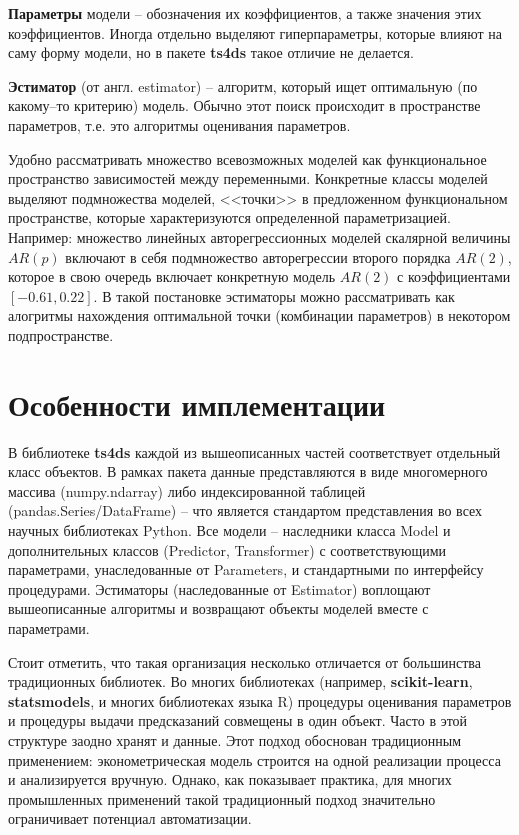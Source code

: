 \documentclass[a4paper,14pt]{extreport}
\begin{document}
	\textbf{Параметры} модели -- обозначения их коэффициентов, а также значения этих коэффициентов. Иногда отдельно выделяют гиперпараметры, которые влияют на саму форму модели, но в пакете \textbf{ts4ds} такое отличие не делается.
	
	\textbf{Эстиматор} (от англ. estimator) -- алгоритм, который ищет оптимальную (по какому--то критерию) модель. Обычно этот поиск происходит в пространстве параметров, т.е. это алгоритмы оценивания параметров.
	
	Удобно рассматривать множество всевозможных моделей как функциональное пространство зависимостей между переменными. Конкретные классы моделей выделяют подмножества моделей, <<точки>> в предложенном функциональном пространстве, которые характеризуются определенной параметризацией. Например: множество линейных авторегрессионных моделей скалярной величины $AR(p)$ включают в себя подмножество авторегрессии второго порядка $AR(2)$, которое в свою очередь включает конкретную модель $AR(2)$ с коэффициентами $[-0.61, 0.22]$. В такой постановке эстиматоры можно рассматривать как алогритмы нахождения оптимальной точки (комбинации параметров) в некотором подпространстве.
	
	\section{Особенности имплементации}
	
	В библиотеке \textbf{ts4ds} каждой из вышеописанных частей соответствует отдельный класс объектов. В рамках пакета данные представляются в виде многомерного массива (numpy.ndarray) либо индексированной таблицей (pandas.Series/DataFrame) -- что является стандартом представления во всех научных библиотеках Python. Все модели -- наследники класса Model и дополнительных классов (Predictor, Transformer) с соответствующими параметрами, унаследованные от Parameters, и стандартными по интерфейсу процедурами. Эстиматоры (наследованные от Estimator) воплощают вышеописанные алгоритмы и возвращают объекты моделей вместе с параметрами.
	
	Стоит отметить, что такая организация несколько отличается от большинства традиционных библиотек. Во многих библиотеках (например, \textbf{scikit-learn}, \textbf{statsmodels}\cite{statsmodels}, и многих библиотеках языка R) процедуры оценивания параметров и процедуры выдачи предсказаний совмещены в один объект. Часто в этой структуре заодно хранят и данные. Этот подход обоснован традиционным применением: эконометрическая модель строится на одной  реализации процесса и анализируется вручную. Однако, как показывает практика, для многих промышленных применений такой традиционный подход значительно ограничивает потенциал автоматизации. 
	
\end{document}
